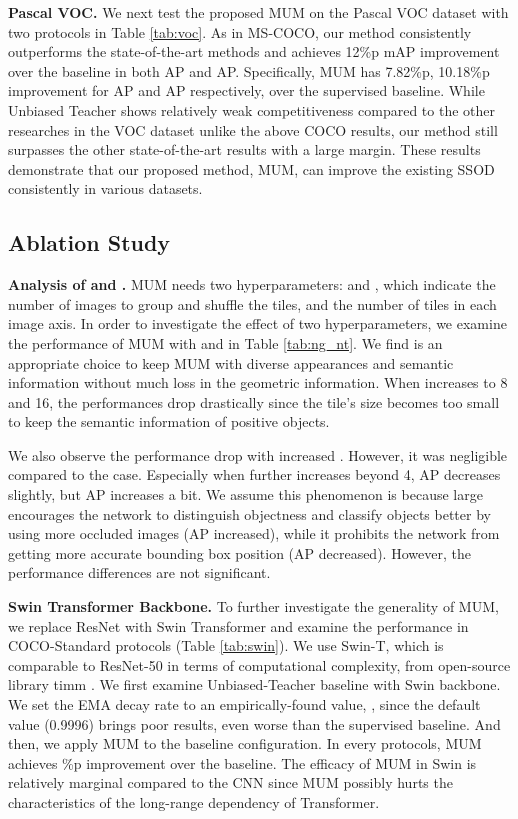 \documentclass[10pt,twocolumn,letterpaper]{article}
\begin{document}
\noindent\textbf{Pascal VOC.}
We next test the proposed MUM on the Pascal VOC dataset with two protocols in Table \ref{tab:voc}.
As in MS-COCO, our method consistently outperforms the state-of-the-art methods and achieves 12\%p mAP improvement over the baseline in both AP and AP.
Specifically, MUM has 7.82\%p, 10.18\%p improvement for AP and AP respectively, over the supervised baseline. 
While Unbiased Teacher shows relatively weak competitiveness compared to the other researches in the VOC dataset unlike the above COCO results, our method still surpasses the other state-of-the-art results with a large margin.
These results demonstrate that our proposed method, MUM, can improve the existing SSOD consistently in various datasets.
\subsection{Ablation Study}
\noindent\textbf{Analysis of  and .} 
MUM needs two hyperparameters:  and , which indicate the  number of images to group and shuffle the tiles, and the number of tiles in each image axis.
In order to investigate the effect of two hyperparameters, we examine the performance of MUM with  and  in Table \ref{tab:ng_nt}.
We find  is an appropriate choice to keep MUM with diverse appearances and semantic information without much loss in the geometric information.
When  increases to 8 and 16, the performances drop drastically since the tile's size becomes too small to keep the semantic information of positive objects.

We also observe the performance drop with increased . However, it was negligible compared to the  case.
Especially when  further increases beyond 4, AP decreases slightly, but AP increases a bit.
We assume this phenomenon is because large  encourages the network to distinguish objectness and classify objects better by using more occluded images (AP increased), while it prohibits the network from getting more accurate bounding box position (AP decreased). However, the performance differences are not significant.

\noindent\textbf{Swin Transformer Backbone.} 
To further investigate the generality of MUM, we replace ResNet with Swin Transformer\cite{liu2021swin} and examine the performance in COCO-Standard protocols (Table \ref{tab:swin}).
We use Swin-T, which is comparable to ResNet-50 in terms of computational complexity, from open-source library timm \cite{rw2019timm}.
We first examine Unbiased-Teacher \cite{liu2021unbiased} baseline with Swin backbone.
We set the EMA decay rate to an empirically-found value, , since the default value (0.9996) brings poor results, even worse than the supervised baseline.
And then, we apply MUM to the baseline configuration.
In every protocols, MUM achieves \%p improvement over the baseline.
The efficacy of MUM in Swin is relatively marginal compared to the CNN since MUM possibly hurts the characteristics of the long-range dependency of Transformer.
\end{document}
